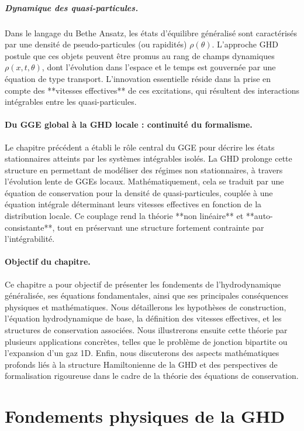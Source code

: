 \subparagraph{Dynamique des quasi-particules.}
Dans le langage du Bethe Ansatz, les états d’équilibre généralisé sont caractérisés par une densité de pseudo-particules (ou rapidités) $\rho(\theta)$. L’approche GHD postule que ces objets peuvent être promus au rang de champs dynamiques $\rho(x,t,\theta)$, dont l’évolution dans l’espace et le temps est gouvernée par une équation de type transport. L’innovation essentielle réside dans la prise en compte des **vitesses effectives** de ces excitations, qui résultent des interactions intégrables entre les quasi-particules.

\paragraph{Du GGE global à la GHD locale : continuité du formalisme.}
Le chapitre précédent a établi le rôle central du GGE pour décrire les états stationnaires atteints par les systèmes intégrables isolés. La GHD prolonge cette structure en permettant de modéliser des régimes non stationnaires, à travers l’évolution lente de GGEs locaux. Mathématiquement, cela se traduit par une équation de conservation pour la densité de quasi-particules, couplée à une équation intégrale déterminant leurs vitesses effectives en fonction de la distribution locale. Ce couplage rend la théorie **non linéaire** et **auto-consistante**, tout en préservant une structure fortement contrainte par l’intégrabilité.

\paragraph{Objectif du chapitre.}
Ce chapitre a pour objectif de présenter les fondements de l’hydrodynamique généralisée, ses équations fondamentales, ainsi que ses principales conséquences physiques et mathématiques. Nous détaillerons les hypothèses de construction, l’équation hydrodynamique de base, la définition des vitesses effectives, et les structures de conservation associées. Nous illustrerons ensuite cette théorie par plusieurs applications concrètes, telles que le problème de jonction bipartite ou l’expansion d’un gaz 1D. Enfin, nous discuterons des aspects mathématiques profonds liés à la structure Hamiltonienne de la GHD et des perspectives de formalisation rigoureuse dans le cadre de la théorie des équations de conservation.



\section{Fondements physiques de la GHD}

